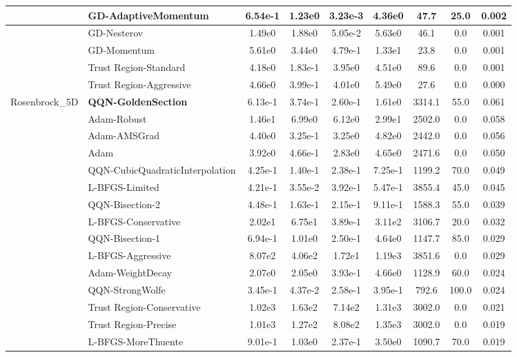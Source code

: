 \documentclass{article}
\begin{document}
\begin{longtable}{|l|l|c|c|c|c|c|c|c|}
\hline
 & GD-AdaptiveMomentum & 6.54e-1 & 1.23e0 & 3.23e-3 & 4.36e0 & 47.7 & 25.0 & 0.002 \\
\hline
 & GD-Nesterov & 1.49e0 & 1.88e0 & 5.05e-2 & 5.63e0 & 46.1 & 0.0 & 0.001 \\
\hline
 & GD-Momentum & 5.61e0 & 3.44e0 & 4.79e-1 & 1.33e1 & 23.8 & 0.0 & 0.001 \\
\hline
 & Trust Region-Standard & 4.18e0 & 1.83e-1 & 3.95e0 & 4.51e0 & 89.6 & 0.0 & 0.001 \\
\hline
 & Trust Region-Aggressive & 4.66e0 & 3.99e-1 & 4.01e0 & 5.49e0 & 27.6 & 0.0 & 0.000 \\
Rosenbrock\_5D & \textbf{QQN-GoldenSection} & 6.13e-1 & 3.74e-1 & 2.60e-1 & 1.61e0 & 3314.1 & 55.0 & 0.061 \\
\hline
 & Adam-Robust & 1.46e1 & 6.99e0 & 6.12e0 & 2.99e1 & 2502.0 & 0.0 & 0.058 \\
\hline
 & Adam-AMSGrad & 4.40e0 & 3.25e-1 & 3.25e0 & 4.82e0 & 2442.0 & 0.0 & 0.056 \\
\hline
 & Adam & 3.92e0 & 4.66e-1 & 2.83e0 & 4.65e0 & 2471.6 & 0.0 & 0.050 \\
\hline
 & QQN-CubicQuadraticInterpolation & 4.25e-1 & 1.40e-1 & 2.38e-1 & 7.25e-1 & 1199.2 & 70.0 & 0.049 \\
\hline
 & L-BFGS-Limited & 4.21e-1 & 3.55e-2 & 3.92e-1 & 5.47e-1 & 3855.4 & 45.0 & 0.045 \\
\hline
 & QQN-Bisection-2 & 4.48e-1 & 1.63e-1 & 2.15e-1 & 9.11e-1 & 1588.3 & 55.0 & 0.039 \\
\hline
 & L-BFGS-Conservative & 2.02e1 & 6.75e1 & 3.89e-1 & 3.11e2 & 3106.7 & 20.0 & 0.032 \\
\hline
 & QQN-Bisection-1 & 6.94e-1 & 1.01e0 & 2.50e-1 & 4.64e0 & 1147.7 & 85.0 & 0.029 \\
\hline
 & L-BFGS-Aggressive & 8.07e2 & 4.06e2 & 1.72e1 & 1.19e3 & 3851.6 & 0.0 & 0.029 \\
\hline
 & Adam-WeightDecay & 2.07e0 & 2.05e0 & 3.93e-1 & 4.66e0 & 1128.9 & 60.0 & 0.024 \\
\hline
 & QQN-StrongWolfe & 3.45e-1 & 4.37e-2 & 2.58e-1 & 3.95e-1 & 792.6 & 100.0 & 0.024 \\
\hline
 & Trust Region-Conservative & 1.02e3 & 1.63e2 & 7.14e2 & 1.31e3 & 3002.0 & 0.0 & 0.021 \\
\hline
 & Trust Region-Precise & 1.01e3 & 1.27e2 & 8.08e2 & 1.35e3 & 3002.0 & 0.0 & 0.019 \\
\hline
 & L-BFGS-MoreThuente & 9.01e-1 & 1.03e0 & 2.37e-1 & 3.50e0 & 1090.7 & 70.0 & 0.019 \\

\end{longtable}
\end{document}
